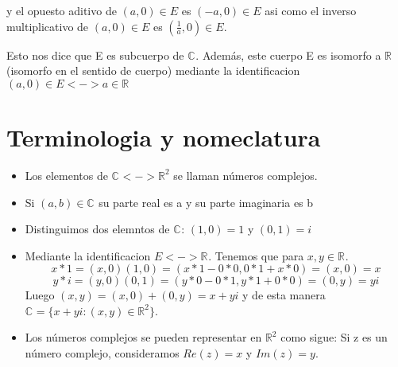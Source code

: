 y el opuesto aditivo de \( (a,0) \in E\) es \( (-a,0) \in E\) asi como el inverso multiplicativo de  \( (a,0) \in E\) es \( (\frac{1}{a},0) \in E\).

Esto nos dice que E es subcuerpo de \(\mathbb{C}^{}\). Además, este cuerpo E es isomorfo a \(\mathbb{R}^{}\) (isomorfo en el sentido de cuerpo) mediante la identificacion \((a,0) \in E <-> a \in \mathbb{R}^{}\) %

\section{Terminologia y nomeclatura}

\begin{itemize}
  \item Los elementos de \(\mathbb{C}^{} <-> \mathbb{R}^{2}\) se llaman números complejos.

    \item Si \((a,b) \in \mathbb{C}^{} \) su parte real es a y su parte imaginaria es b

      \item Distinguimos dos elemntos de \(\mathbb{C}^{}\): \((1,0) = 1\) y \((0,1) = i\)

        \item Mediante la identificacion \( E <-> \mathbb{R}^{}\). Tenemos que para \(x,y \in \mathbb{R}^{}\).
\[ x*1=(x,0)(1,0)=(x*1-0*0, 0*1+x*0)=(x,0)=x \]
\[ y*i=(y,0)(0,1)=(y*0-0*1, y*1+0*0)=(0,y)=yi \]
Luego \((x,y) = (x,0)+(0,y) = x + yi\) y de esta manera \(\mathbb{C}^{} = \{x+yi : (x,y) \in \mathbb{R}^{2}\}\).

  \item Los números complejos se pueden representar en \(\mathbb{R}^{2}\) como sigue:
Si z es un número complejo, consideramos \(Re(z) = x\) y \(Im(z) = y\).
\end{itemize}


